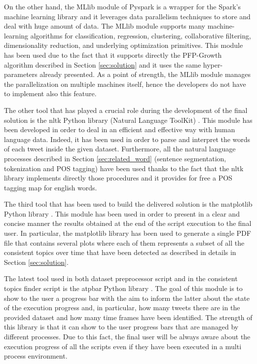 \noindent On the other hand, the MLlib module of Pyspark is a wrapper for the Spark's machine learning library and it leverages data parallelism techniques to store and deal with huge amount of data. The MLlib module supports many machine-learning algorithms for classification, regression, clustering, collaborative filtering, dimensionality reduction, and underlying optimization primitives. This module has been used due to the fact that it supports directly the PFP-Growth algorithm described in Section \ref{sec:solution} and it uses the same hyper-parameters already presented. As a point of strength, the MLlib module manages the parallelization on multiple machines itself, hence the developers do not have to implement also this feature.

The other tool that has played a crucial role during the development of the final solution is the nltk Python library (Natural Language ToolKit) \cite{python-nltk}. This module has been developed in order to deal in an efficient and effective way with human language data. Indeed, it has been used in order to parse and interpret the words of each tweet inside the given dataset. Furthermore, all the natural language processes described in Section \ref{sec:related_word} (sentence segmentation, tokenization and POS tagging) have been used thanks to the fact that the nltk library implements directly those procedures and it provides for free a POS tagging map for english words.

The third tool that has been used to build the delivered solution is the matplotlib Python library \cite{matplotlib-python}. This module has been used in order to present in a clear and concise manner the results obtained at the end of the script execution to the final user. In particular, the matplotlib library has been used to generate a single PDF file that contains several plots where each of them represents a subset of all the consistent topics over time that have been detected as described in details in Section \ref{sec:solution}.

The latest tool used in both dataset preprocessor script and in the consistent topics finder script is the atpbar Python library \cite{atpbar-reference}. The goal of this module is to show to the user a progress bar with the aim to inform the latter about the state of the execution progress and, in particular, how many tweets there are in the provided dataset and how many time frames have been identified. The strength of this library is that it can show to the user progress bars that are managed by different processes. Due to this fact, the final user will be always aware about the execution progress of all the scripts even if they have been executed in a multi process environment.

